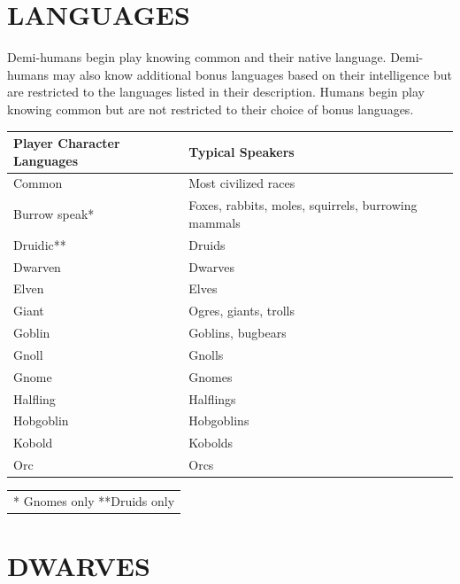 \begin{multicols}{2}

\section{LANGUAGES}

Demi-humans begin play knowing common and their native language.  Demi-humans may also know additional bonus languages based on their intelligence but are restricted to the languages listed in their description.  Humans begin play knowing common but are not restricted to their choice of bonus languages.

\noindent
\begin{minipage}{\columnwidth}

\label{languages}
\noindent
\begin{tabular}{|p{}|p{}|}
\hline
Player Character Languages			& Typical Speakers \\
\hline\hline
\rowcolor[gray]{.9}Common			& Most civilized races \\
Burrow speak*	& Foxes, rabbits, moles, squirrels, burrowing mammals \\
\rowcolor[gray]{.9}Druidic**		& Druids \\
Dwarven			& Dwarves \\
\rowcolor[gray]{.9}Elven			& Elves \\
Giant			& Ogres, giants, trolls \\
\rowcolor[gray]{.9}Goblin			& Goblins, bugbears \\
Gnoll			& Gnolls \\
\rowcolor[gray]{.9}Gnome			& Gnomes \\
Halfling		& Halflings \\
\rowcolor[gray]{.9}Hobgoblin		& Hobgoblins \\
Kobold			& Kobolds \\
\rowcolor[gray]{.9}Orc				& Orcs \\
\hline
\end{tabular}
\noindent
\begin{tabular}{p{\columnwidth}}
* Gnomes only **Druids only \\
\end{tabular}\vspace{.5em}

\end{minipage}

\section{DWARVES}


\end{multicols}
